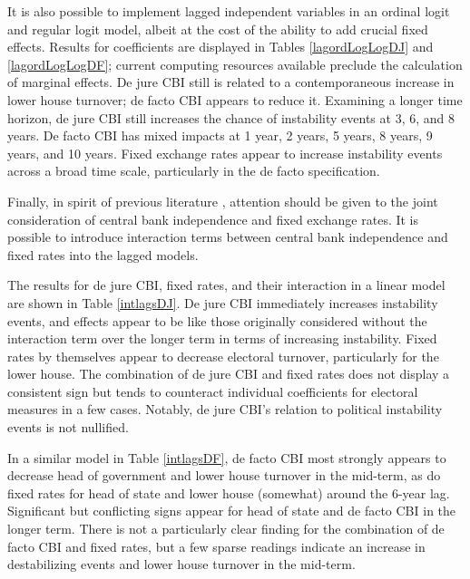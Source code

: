 \documentclass{article}
\begin{document}
    
    

    It is also possible to implement lagged independent variables in an ordinal logit and regular logit model, albeit at the cost of the ability to add crucial fixed effects. Results for coefficients are displayed in Tables \ref*{lagordLogLogDJ} and \ref*{lagordLogLogDF}; current computing resources available preclude the calculation of marginal effects. De jure CBI still is related to a contemporaneous increase in lower house turnover; de facto CBI appears to reduce it. Examining a longer time horizon, de jure CBI still increases the chance of instability events at 3, 6, and 8 years. De facto CBI has mixed impacts at 1 year, 2 years, 5 years, 8 years, 9 years, and 10 years. Fixed exchange rates appear to increase instability events across a broad time scale, particularly in the de facto specification.

    
    

    Finally, in spirit of previous literature \citep{broz_political_2002}, attention should be given to the joint consideration of central bank independence and fixed exchange rates. It is possible to introduce interaction terms between central bank independence and fixed rates into the lagged models. 

    The results for de jure CBI, fixed rates, and their interaction in a linear model are shown in Table \ref*{intlagsDJ}. De jure CBI immediately increases instability events, and effects appear to be like those originally considered without the interaction term over the longer term in terms of increasing instability. Fixed rates by themselves appear to decrease electoral turnover, particularly for the lower house. The combination of de jure CBI and fixed rates does not display a consistent sign but tends to counteract individual coefficients for electoral measures in a few cases. Notably, de jure CBI’s relation to political instability events is not nullified.
    
    In a similar model in Table \ref*{intlagsDF}, de facto CBI most strongly appears to decrease head of government and lower house turnover in the mid-term, as do fixed rates for head of state and lower house (somewhat) around the 6-year lag. Significant but conflicting signs appear for head of state and de facto CBI in the longer term. There is not a particularly clear finding for the combination of de facto CBI and fixed rates, but a few sparse readings indicate an increase in destabilizing events and lower house turnover in the mid-term.
    
\end{document}
